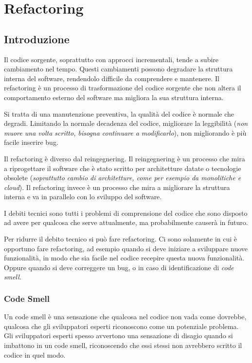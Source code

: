 \chapter{Refactoring}
\section{Introduzione}
\begin{tcolorbox}[title = Refactoring]
    Il codice sorgente, soprattutto con approcci incrementali, tende a 
    subire cambiamento nel tempo. Questi cambiamenti possono degradare 
    la struttura interna del software, rendendolo difficile da
    comprendere e mantenere. Il refactoring è un processo di
    trasformazione del codice sorgente che non altera il comportamento
    esterno del software ma migliora la sua struttura interna.
\end{tcolorbox}
Si tratta di una manutenzione preventiva, la qualità del codice è normale 
che degradi. Limitando la normale decadenza del codice, migliorare  
la leggibilità (\textit{non muore una volta scritto, bisogna 
continuare a modificarlo}), non migliorando è più facile inserire 
bug. 

Il refactoring è diverso dal reingegnering. Il reingegnering è un
processo che mira a riprogettare il software che è stato scritto
per architetture datate o tecnologie obsolete (\textit{soprattutto 
cambio di architetture, come per esempio da monolitiche e cloud}).
Il refactoring
invece è un processo che mira a migliorare la struttura interna
e va in parallelo con lo sviluppo del software.

\begin{tcolorbox}[title = Debito tecnico]
    I debiti tecnici sono tutti i problemi di comprensione del codice 
    che sono disposto ad avere per qualcosa che serve attualmente, 
    ma probabilmente causerà in futuro.
\end{tcolorbox}
Per ridurre il debito tecnico si può fare refactoring. Ci sono solamente 
in cui è opportuno fare refactoring, ad esempio quando si deve iniziare 
a sviluppare nuove funzionalità, in modo che sia facile nel codice recepire 
questa nuova funzionalità. Oppure quando si deve correggere un bug, o 
in caso di identificazione di \textit{code smell}. 
\subsection{Code Smell}
Un code smell è una sensazione che qualcosa nel codice non vada come dovrebbe, qualcosa che gli sviluppatori esperti riconoscono come un potenziale problema. Gli sviluppatori esperti spesso avvertono una sensazione di disagio quando si imbattono in un code smell, riconoscendo che essi stessi non avrebbero scritto il codice in quel modo.

